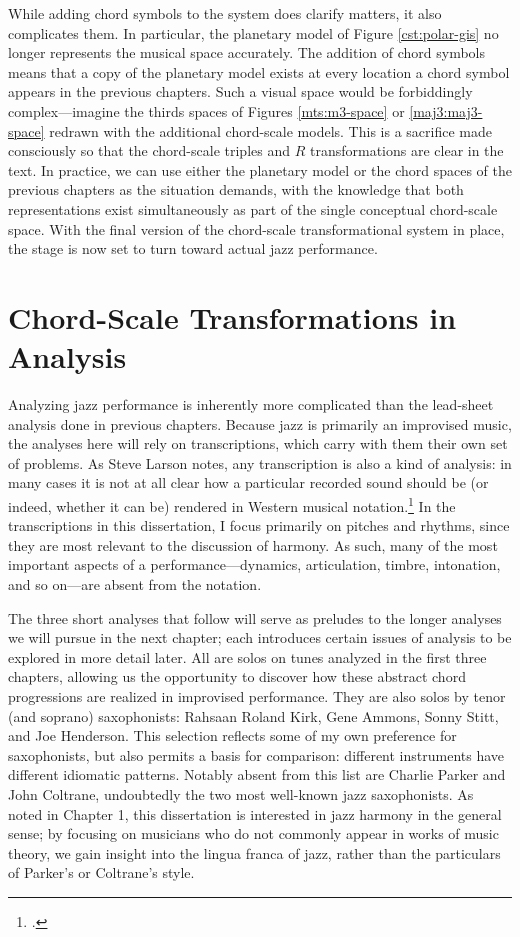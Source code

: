 While adding chord symbols to the system does clarify matters, it also
complicates them. In particular, the planetary model of Figure
\ref{cst:polar-gis} no longer represents the musical space accurately. The
addition of chord symbols means that a copy of the planetary model exists at
every location a chord symbol appears in the previous chapters.
Such a visual space would be forbiddingly complex---imagine the thirds spaces
of Figures \ref{mts:m3-space} or \ref{maj3:maj3-space} redrawn with the
additional chord-scale models. This is a sacrifice made consciously so that
the chord-scale triples and $R$ transformations are clear in the text. In
practice, we can use either the planetary model or the chord spaces of the
previous chapters as the situation demands, with the knowledge that both
representations exist simultaneously as part of the single conceptual
chord-scale space. With the final version of the chord-scale transformational
system in place, the stage is now set to turn toward actual jazz
performance.

\section{Chord-Scale Transformations in Analysis}
\label{sec:chord-scale-analysis}

Analyzing jazz performance is inherently more complicated than the
lead-sheet analysis done in previous chapters. Because jazz is primarily an
improvised music, the analyses here will rely on transcriptions, which carry
with them their own set of problems. As Steve Larson notes, any
transcription is also a kind of analysis: in many cases it is not at all clear
how a particular recorded sound should be (or indeed, whether it can be)
rendered in Western musical notation.\footcite[1--2]{larson:2009} In the
transcriptions in this dissertation, I focus primarily on pitches and rhythms,
since they are most relevant to the discussion of harmony. As such, many
of the most important aspects of a performance---dynamics, articulation,
timbre, intonation, and so on---are absent from the notation.

The three short analyses that follow will serve as preludes to the longer
analyses we will pursue in the next chapter; each introduces
certain issues of analysis to be explored in more detail later. All are
solos on tunes analyzed in the first three chapters, allowing us the
opportunity to discover how these abstract chord progressions are realized in
improvised performance. They are also solos by tenor (and soprano)
saxophonists: Rahsaan Roland Kirk, Gene Ammons, Sonny Stitt, and Joe
Henderson. This selection reflects some of my own preference for saxophonists,
but also permits a basis for comparison: different instruments have
different idiomatic patterns. Notably absent from this list are Charlie Parker
and John Coltrane, undoubtedly the two most well-known jazz saxophonists. As noted in
Chapter 1, this dissertation is interested in jazz harmony in the general
sense; by focusing on musicians who do not commonly appear in works of music
theory, we gain insight into the lingua franca of jazz, rather than the
particulars of Parker's or Coltrane's style.

